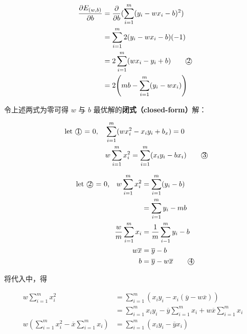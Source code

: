 \documentclass[../studies-ml.tex]{subfiles}
\begin{document}
\begin{equation}
  \begin{split}
    \frac{\partial E_{(w,b)}}{\partial b} & = \frac{\partial}{\partial b}(\sum_{i=1}^{m} (y_i - wx_i - b)^2) \\
    & = \sum_{i=1}^{m} 2(y_i - wx_i - b)(-1) \\
    & = 2 \sum_{i=1}^{m} (wx_i - y_i + b) \makebox[2em][l]{\qquad\textcircled{2}} \\
    & = 2 \Biggl(mb - \sum_{i=1}^{m}(y_i - wx_i)\Biggr)
  \end{split}
\end{equation}

令上述两式为零可得 $w$ 与 $b$ 最优解的\textbf{闭式（closed-form）}解：

\begin{align*}
  \text{let \textcircled{1} = 0,}\quad & \sum_{i=1}^{m} (wx_i^2 - x_i y_i + b_x) = 0                                                    \\
                                       & w\sum_{i=1}^{m} x_i^2 = \sum_{i=1}^{m} (x_iy_i - bx_i) \makebox[2em][l]{\qquad\textcircled{3}}
\end{align*}

\begin{align*}
  \text{let \textcircled{2} = 0,}\quad w\sum_{i=1}^{m} x_i^2 & = \sum_{i=1}^{m} (y_i - b)                                             \\
                                                             & = \sum_{i=1}^{m} y_i - mb                                              \\
  \frac{w}{m} \sum_{i=1}^{m} x_i                             & = \frac{1}{m} \sum_{i-1}^{m} y_i - b                                   \\
  w \overline{x}                                             & = \overline{y} - b                                                     \\
  b                                                          & = \overline{y} - w\overline{x} \makebox[2em][l]{\qquad\textcircled{4}} \\
\end{align*}

将代入中，得

\begin{align*}
  w \sum_{i=1}^{m} x_i^2                                    & = \sum_{i=1}^{m} (x_i y_i - x_i (\overline{y} - w\overline{x}))                               \\
                                                            & = \sum_{i=1}^{m} x_i y_i - \overline{y} \sum_{i=1}^{m} x_i + w\overline{x} \sum_{i=1}^{m} x_i \\
  w (\sum_{i=1}^{m} x_i^2 - \overline{x}\sum_{i=1}^{m} x_i) & = \sum_{i=1}^{m} (x_i y_i - \overline{y} x_i)
\end{align*}
\end{document}
